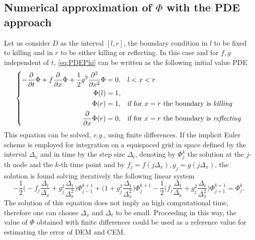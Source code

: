 \subsection{Numerical approximation of $\Phi$ with the PDE approach}

Let us consider $D$ as the interval $\left[ l,r \right]$, the boundary condition in $l$ to be fixed to killing and in $r$ to be either killing or reflecting. In this case and for $f,g$ independent of $t$, \eqref{eq:PDEPhi} can be written as the following initial value PDE 
\begin{equation}\label{eq:PDEPhiOneD}
\left \{
\begin{aligned}
	-\frac{\partial}{\partial t} \Phi + f\frac{\partial}{\partial x} \Phi + \frac{1}{2}g^2 \frac{\partial^2}{\partial x^2} \Phi &= 0, && l < x < r \\
	\Phi(l) &= 1, \\
	\Phi(r) &= 1, && \text{if for $x = r$ the boundary is \textit{killing}} \\
	\frac{\partial}{\partial x}\Phi(r) &= 0, && \text{if for $x = r$ the boundary is \textit{reflecting}} \\
\end{aligned} \right .
\end{equation}
This equation can be solved, \textit{e.g.}, using finite differences. If the implicit Euler scheme is employed for integration on a equispaced grid in space defined by the interval $\Delta_x$ and in time by the step size $\Delta_t$, denoting by $\Phi_j^k$ the solution at the $j$-th node and the $k$-th time point and by $f_j = f(j\Delta_x), g_j = g(j\Delta_x)$, the solution is found solving iteratively the following linear system
\begin{equation}\label{eq:FDPhi}
	- \frac{1}{2}\Big(-f_j \frac{\Delta_t}{\Delta_x} + g_j^2 \frac{\Delta_t}{\Delta_x^2}\Big)\Phi_{j-1}^{k+1} + \Big(1 + g_j^2 \frac{\Delta_t}{\Delta_x^2}\Big)\Phi_j^{k+1} - \frac{1}{2}\Big(f_j \frac{\Delta_t}{\Delta_x} + g_j^2 \frac{\Delta_t}{\Delta_x^2}\Big)\Phi_{j+1}^{k+1}  = \Phi_j^k.
\end{equation}
The solution of this equation does not imply an high computational time, therefore one can choose $\Delta_x$ and $\Delta_t$ to be small. Proceeding in this way, the value of $\Phi$ obtained with finite differences could be used as a reference value for estimating the error of DEM and CEM.
